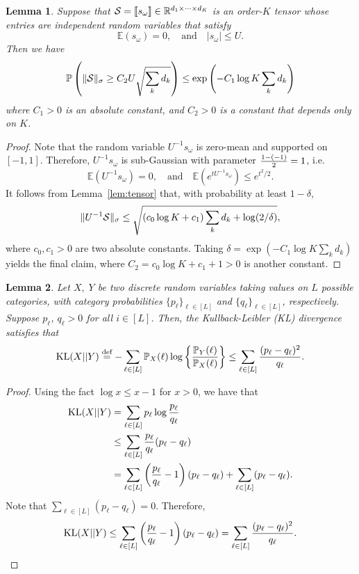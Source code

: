 \documentclass[11pt]{article}
\theoremstyle{plain}
\newtheorem{lem}{Lemma}
\theoremstyle{definition}
\begin{document}
\begin{lem} \label{lem:noisytensor}
Suppose that $\mathcal{S}=\llbracket s_{\omega} \rrbracket\in\mathbb{R}^{d_1\times \cdots \times d_K}$ is an order-$K$ tensor whose entries are independent random variables that satisfy
\[
\mathbb{E}(s_{\omega})=0,\quad \text{and}\quad |s_{\omega}|\leq U.
\]
Then we have
\[
\mathbb{P}\left(\lVert\mathcal{S}\rVert_\sigma\geq C_2 U\sqrt{\sum_k d_k} \right)\leq \exp\left(-C_1  \log K \sum_k d_k\right)
\]
where $C_1>0$ is an absolute constant, and $C_2>0$ is a constant that depends only on $K$.
\end{lem}

\begin{proof}  Note that the random variable $U^{-1}s_{\omega}$ is zero-mean and supported on $[-1,1]$. Therefore, $U^{-1}s_{\omega}$ is sub-Gaussian with parameter ${1-(-1)\over 2}=1$, i.e.
\[
\mathbb{E}(U^{-1}s_{\omega})=0,\quad \text{and}\quad \mathbb{E}(e^{tU^{-1}s_{\omega}})\leq e^{t^2/2}.
\]
It follows from Lemma~\ref{lem:tensor} that, with probability at least $1-\delta$,
\[
\lVert U^{-1}\mathcal{S}\rVert_\sigma\leq \sqrt{\left(c_0\log K+c_1\right) \sum_k d_k +\log (2/\delta)},
\]
where $c_0, c_1>0$ are two absolute constants. Taking $\delta=\exp (-C_1\log K \sum_k d_k)$ yields the final claim, where $C_2=c_0\log K+c_1+1>0$ is another constant.
\end{proof}


\begin{lem}\label{lem:KLentry} Let $X,\; Y$ be two discrete random variables taking values on $L$ possible categories, with category probabilities $\{p_\ell\}_{\ell\in[L]}$ and $\{q_\ell\}_{\ell\in[L]}$, respectively.  Suppose $p_\ell$, $q_\ell>0$ for all $i\in[L]$. Then, the Kullback-Leibler (KL) divergence satisfies that
\[
\mathrm{KL}(X||Y)\stackrel{\text{def}}{=}-\sum_{\ell\in[L]}\mathbb{P}_X(\ell)\log\left\{{\mathbb{P}_Y(\ell)\over \mathbb{P}_X(\ell)}\right\} \leq \sum_{\ell \in [L]}{(p_\ell-q_\ell)^2 \over q_\ell}.
\]
\end{lem}
\begin{proof} Using the fact $\log x\leq x-1$ for $x>0$, we have that
\begin{align}\label{eq:KL}
\text{KL}(X||Y)&=\sum_{\ell\in[L]}p_\ell\log{p_\ell\over q_\ell}\\
&\leq \sum_{\ell\in[L]} {p_\ell\over q_\ell}(p_\ell-q_\ell)\\
&=\sum_{\ell\in[L]} \left({p_\ell\over q_\ell }- 1\right)(p_\ell-q_\ell)+ \sum_{\ell\in[L]} (p_\ell-q_\ell).
\end{align}
Note that $\sum_{\ell\in[L]}(p_\ell-q_\ell)=0$. Therefore,
\[
\text{KL}(X||Y)\leq \sum_{\ell\in[L]}\left( {p_\ell\over q_\ell}-1\right)\left(p_\ell-q_\ell\right)=\sum_{\ell\in[L]}{(p_\ell-q_\ell)^2\over q_\ell}.
\]
\end{proof}
\end{document}
